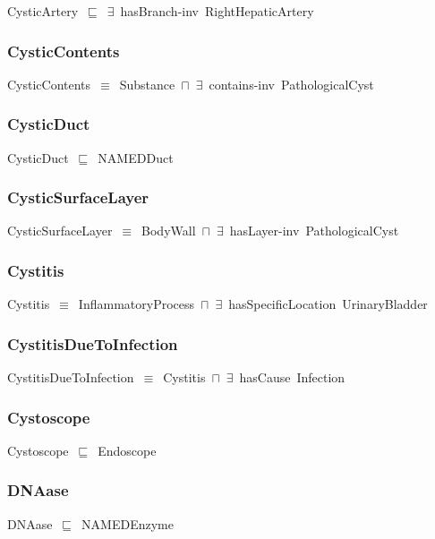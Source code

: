 \documentclass{article}
\begin{document}
CysticArtery~\ensuremath{\sqsubseteq}~\ensuremath{\exists}~hasBranch-inv~RightHepaticArtery~

\subsubsection*{CysticContents}

CysticContents~\ensuremath{\equiv}~Substance~\ensuremath{\sqcap}~\ensuremath{\exists}~contains-inv~PathologicalCyst

\subsubsection*{CysticDuct}

CysticDuct~\ensuremath{\sqsubseteq}~NAMEDDuct~

\subsubsection*{CysticSurfaceLayer}

CysticSurfaceLayer~\ensuremath{\equiv}~BodyWall~\ensuremath{\sqcap}~\ensuremath{\exists}~hasLayer-inv~PathologicalCyst

\subsubsection*{Cystitis}

Cystitis~\ensuremath{\equiv}~InflammatoryProcess~\ensuremath{\sqcap}~\ensuremath{\exists}~hasSpecificLocation~UrinaryBladder

\subsubsection*{CystitisDueToInfection}

CystitisDueToInfection~\ensuremath{\equiv}~Cystitis~\ensuremath{\sqcap}~\ensuremath{\exists}~hasCause~Infection

\subsubsection*{Cystoscope}

Cystoscope~\ensuremath{\sqsubseteq}~Endoscope~

\subsubsection*{DNAase}

DNAase~\ensuremath{\sqsubseteq}~NAMEDEnzyme~
\end{document}
